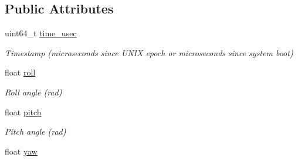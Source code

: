 \subsection*{Public Attributes}
\begin{DoxyCompactItemize}
\item 
\hypertarget{struct____mavlink__hil__state__t_a19f9efdaaddd6d9699f8225bf5a4d4ef}{uint64\+\_\+t \hyperlink{struct____mavlink__hil__state__t_a19f9efdaaddd6d9699f8225bf5a4d4ef}{time\+\_\+usec}}\label{struct____mavlink__hil__state__t_a19f9efdaaddd6d9699f8225bf5a4d4ef}

\begin{DoxyCompactList}\small\item\em Timestamp (microseconds since U\+N\+I\+X epoch or microseconds since system boot) \end{DoxyCompactList}\item 
\hypertarget{struct____mavlink__hil__state__t_a33202a922fda8d956b7ce78814d82558}{float \hyperlink{struct____mavlink__hil__state__t_a33202a922fda8d956b7ce78814d82558}{roll}}\label{struct____mavlink__hil__state__t_a33202a922fda8d956b7ce78814d82558}

\begin{DoxyCompactList}\small\item\em Roll angle (rad) \end{DoxyCompactList}\item 
\hypertarget{struct____mavlink__hil__state__t_a734b8ba645687e5673c599c4a9a950f1}{float \hyperlink{struct____mavlink__hil__state__t_a734b8ba645687e5673c599c4a9a950f1}{pitch}}\label{struct____mavlink__hil__state__t_a734b8ba645687e5673c599c4a9a950f1}

\begin{DoxyCompactList}\small\item\em Pitch angle (rad) \end{DoxyCompactList}\item 
\hypertarget{struct____mavlink__hil__state__t_aa7a7dfae39434c0c51492cb2d5614863}{float \hyperlink{struct____mavlink__hil__state__t_aa7a7dfae39434c0c51492cb2d5614863}{yaw}}\label{struct____mavlink__hil__state__t_aa7a7dfae39434c0c51492cb2d5614863}


\end{DoxyCompactItemize}
